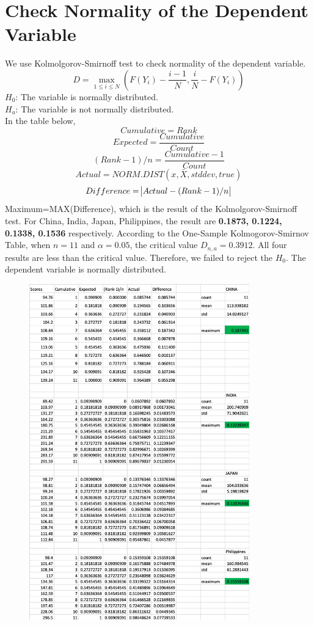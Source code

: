 \documentclass[11pt]{article}
\begin{document}
\section{Check Normality of the Dependent Variable}\label{normality_check}
We use Kolmolgorov-Smirnoff test to check normality of the dependent variable.
$$D=\underset{1 \leq i \leq N}{\max}(F(Y_i)-\frac{i-1}{N},\frac{i}{N}-F(Y_i))$$
$H_0$: The variable is normally distributed.\\
$H_a$: The variable is not normally distributed.\\
In the table below, 
$$Cumulative=Rank$$ 
$$Expected=\frac{Cumulative}{Count}$$ 
$$(Rank-1)/n=\frac{Cumulative-1}{Count}$$
$$Actual=NORM.DIST(x, {\bar X}, stddev, true)$$
$$Difference=\abs{Actual-(Rank-1)/n}$$
Maximum=MAX(Difference), which is the result of the Kolmolgorov-Smirnoff test. For China, India, Japan, Philippines, the result are \textbf{0.1873, 0.1224, 0.1338, 0.1536} respectively. According to the One-Sample Kolmogorov-Smirnov Table, when $n=11$ and $\alpha=0.05$, the critical value $D_{n,a}=0.3912$. All four results are less than the critical value. Therefore, we failed to reject the $H_0$. The dependent variable is normally distributed.
\begin{figure}[H]
\begin{center}
    \includegraphics[width=0.85\textwidth]{./image/KSTest.png}
\end{center}
\end{figure}
\end{document}
